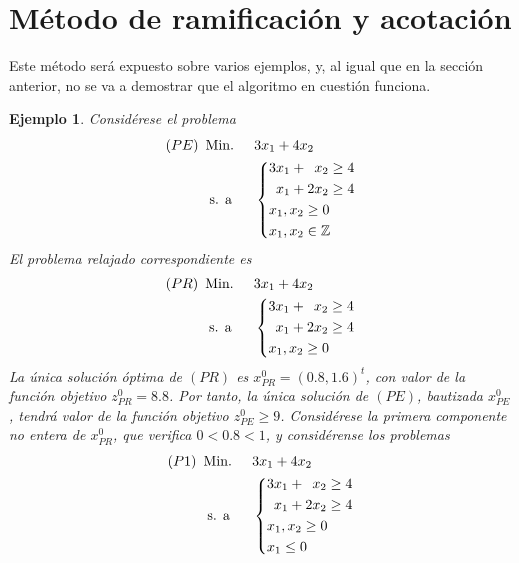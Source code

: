 \documentclass[11pt]{report}
\theoremstyle{mytheorem}
\theoremstyle{mydefinition}
\theoremstyle{myexample}
\newtheorem*{example}{Ejemplo}
\newcommand{\Z}{\mathbb Z}
\begin{document}
\section{Método de ramificación y acotación}

Este método será expuesto sobre varios ejemplos, y, al igual que en la sección anterior, no se va a demostrar que el algoritmo en cuestión funciona.

\begin{example}
Considérese el problema
\[\begin{aligned}[t]
(PE)\ \,&\text{Min. } && 3x_1+4x_2 \\
& \; \text{s. a} &&\left\{\begin{alignedat}{10}
& 3&x_1 & {}+{} &  &x_2 & {}\geq{} &4 \\
&  &x_1 & {}+{} & 2&x_2 & {}\geq{} &4 \\
&\mathrlap{x_1,x_2 \geq 0} \\
&\mathrlap{x_1,x_2 \in \Z}
\end{alignedat}\right.
\end{aligned}\]
El problema relajado correspondiente es
\[\begin{aligned}[t]
(PR)\ \,&\text{Min. } && 3x_1+4x_2 \\
& \; \text{s. a} &&\left\{\begin{alignedat}{10}
& 3&x_1 & {}+{} &  &x_2 & {}\geq{} &4 \\
&  &x_1 & {}+{} & 2&x_2 & {}\geq{} &4 \\
&\mathrlap{x_1,x_2 \geq 0}
\end{alignedat}\right.
\end{aligned}\]
La única solución óptima de $(PR)$ es $x^0_{PR} = (0.8,1.6)^t$, con valor de la función objetivo $z^0_{PR} = 8.8$. Por tanto, la única solución de $(PE)$, bautizada $x^0_{PE}$, tendrá valor de la función objetivo $z^0_{PE} \geq 9$. Considérese la primera componente no entera de $x^0_{PR}$, que verifica $0 < 0.8 < 1$, y considérense los problemas
\[\begin{aligned}[t]
(P1)\ \,&\text{Min. } && 3x_1+4x_2 \\
& \; \text{s. a} &&\left\{\begin{alignedat}{10}
& 3&x_1 & {}+{} &  &x_2 & {}\geq{} &4 \\
&  &x_1 & {}+{} & 2&x_2 & {}\geq{} &4 \\
&\mathrlap{x_1,x_2 \geq 0} \\
&\mathrlap{x_1 \leq 0} \\
\end{alignedat}\right.

\end{aligned}\]
\end{example}
\end{document}
